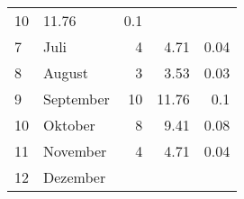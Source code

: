 \begin{longtable}{lXrrr}
       \num{10} &
       \num[round-mode=places,round-precision=2]{11.76} &
         \num[round-mode=places,round-precision=2]{0.1} \\

     7 &
     \multicolumn{1}{X}{ Juli   } &


       \num{4} &
       \num[round-mode=places,round-precision=2]{4.71} &
         \num[round-mode=places,round-precision=2]{0.04} \\

     8 &
     \multicolumn{1}{X}{ August   } &


       \num{3} &
       \num[round-mode=places,round-precision=2]{3.53} &
         \num[round-mode=places,round-precision=2]{0.03} \\

     9 &
     \multicolumn{1}{X}{ September   } &


       \num{10} &
       \num[round-mode=places,round-precision=2]{11.76} &
         \num[round-mode=places,round-precision=2]{0.1} \\

     10 &
     \multicolumn{1}{X}{ Oktober   } &


       \num{8} &
       \num[round-mode=places,round-precision=2]{9.41} &
         \num[round-mode=places,round-precision=2]{0.08} \\

     11 &
     \multicolumn{1}{X}{ November   } &


       \num{4} &
       \num[round-mode=places,round-precision=2]{4.71} &
         \num[round-mode=places,round-precision=2]{0.04} \\

     12 &
     \multicolumn{1}{X}{ Dezember   } &



\end{longtable}
